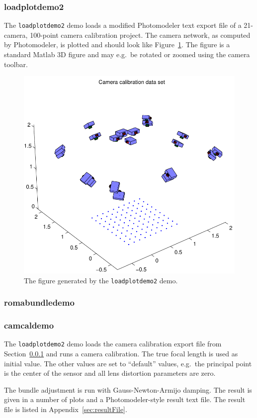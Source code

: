 \documentclass{article}
\begin{document}
\subsubsection{loadplotdemo2}
\label{sec:camcaldata}

The \verb+loadplotdemo2+ demo loads a modified Photomodeler text
export file of a 21-camera, 100-point camera calibration project. The
camera network, as computed by Photomodeler, is plotted and should
look like Figure~\ref{fig:camcalib}. The figure is a standard Matlab
3D figure and may e.g.\ be rotated or zoomed using the camera toolbar.

\begin{figure}
  \centering
  \includegraphics[width=0.6\hsize]{ill/ccam}
  \caption{The figure generated by the \texttt{loadplotdemo2} demo.}
  \label{fig:camcalib}
\end{figure}

\subsubsection{romabundledemo}

\subsubsection{camcaldemo}

The \verb+loadplotdemo2+ demo loads the camera calibration export file
from Section~\ref{sec:camcaldata} and runs a camera calibration. The
true focal length is used as initial value. The other values are set
to ``default'' values, e.g.\ the principal point is the center of the
sensor and all lens distortion parameters are zero.

The bundle adjustment is run with Gauss-Newton-Armijo damping. The
result is given in a number of plots and a Photomodeler-style result
text file. The result file is listed in Appendix~\ref{sec:resultFile}.
\end{document}
